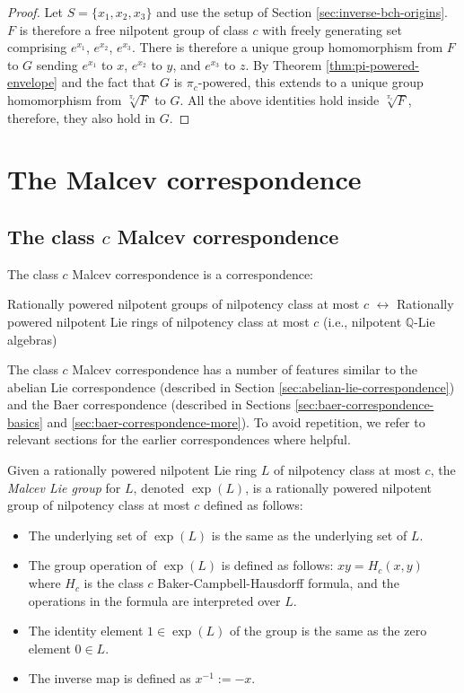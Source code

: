 \documentclass{ucetd}
\begin{document}
\begin{proof}
  Let $S = \{x_1,x_2,x_3\}$ and use the setup of Section
  \ref{sec:inverse-bch-origins}. $F$ is therefore a free nilpotent
  group of class $c$ with freely generating set comprising $e^{x_1}$,
  $e^{x_2}$, $e^{x_3}$. There is therefore a unique group homomorphism
  from $F$ to $G$ sending $e^{x_1}$ to $x$, $e^{x_2}$ to $y$, and
  $e^{x_3}$ to $z$. By Theorem \ref{thm:pi-powered-envelope} and the
  fact that $G$ is $\pi_c$-powered, this extends to a unique group
  homomorphism from $\sqrt[\pi_c]{F}$ to $G$. All the above identities
  hold inside $\sqrt[\pi_c]{F}$, therefore, they also hold in $G$.
\end{proof}

\section{The Malcev correspondence}\label{sec:malcev-correspondence}

\subsection{The class $c$ Malcev correspondence}

The class $c$ Malcev correspondence is a correspondence:

Rationally powered nilpotent groups of nilpotency class at most $c$
$\leftrightarrow$ Rationally powered nilpotent Lie rings of nilpotency
class at most $c$ (i.e., nilpotent $\mathbb{Q}$-Lie algebras)

The class $c$ Malcev correspondence has a number of features similar
to the abelian Lie correspondence (described in Section
\ref{sec:abelian-lie-correspondence}) and the Baer correspondence
(described in Sections \ref{sec:baer-correspondence-basics} and
\ref{sec:baer-correspondence-more}). To avoid repetition, we refer to
relevant sections for the earlier correspondences where helpful.

Given a rationally powered nilpotent Lie ring $L$ of nilpotency class
at most $c$, the {\em Malcev Lie group} for $L$, denoted $\exp(L)$, is
a rationally powered nilpotent group of nilpotency class at most $c$
defined as follows:

\begin{itemize}
\item The underlying set of $\exp(L)$ is the same as the underlying set of
  $L$.
\item The group operation of $\exp(L)$ is defined as follows: $xy =
  H_c(x,y)$ where $H_c$ is the class $c$ Baker-Campbell-Hausdorff
  formula, and the operations in the formula are interpreted over $L$.
\item The identity element $1 \in \exp(L)$ of the group is the same as the
  zero element $0 \in L$.
\item The inverse map is defined as $x^{-1} := -x$.
\end{itemize}
\end{document}
